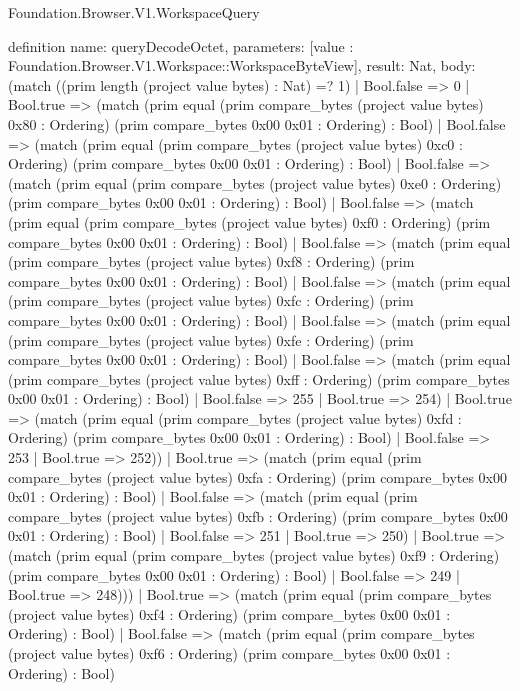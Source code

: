 \begin{lexlean}{Foundation.Browser.V1.WorkspaceQuery}
\begin{semanticmodule}
definition{
  name: queryDecodeOctet,
  parameters: [value : Foundation.Browser.V1.Workspace::WorkspaceByteView],
  result: Nat,
  body: (match ((prim length (project value bytes) : Nat) =? 1)
    | Bool.false => 0
    | Bool.true => (match (prim equal (prim compare_bytes (project value bytes) 0x80 : Ordering) (prim compare_bytes 0x00 0x01 : Ordering) : Bool)
      | Bool.false => (match (prim equal (prim compare_bytes (project value bytes) 0xc0 : Ordering) (prim compare_bytes 0x00 0x01 : Ordering) : Bool)
        | Bool.false => (match (prim equal (prim compare_bytes (project value bytes) 0xe0 : Ordering) (prim compare_bytes 0x00 0x01 : Ordering) : Bool)
          | Bool.false => (match (prim equal (prim compare_bytes (project value bytes) 0xf0 : Ordering) (prim compare_bytes 0x00 0x01 : Ordering) : Bool)
            | Bool.false => (match (prim equal (prim compare_bytes (project value bytes) 0xf8 : Ordering) (prim compare_bytes 0x00 0x01 : Ordering) : Bool)
              | Bool.false => (match (prim equal (prim compare_bytes (project value bytes) 0xfc : Ordering) (prim compare_bytes 0x00 0x01 : Ordering) : Bool)
                | Bool.false => (match (prim equal (prim compare_bytes (project value bytes) 0xfe : Ordering) (prim compare_bytes 0x00 0x01 : Ordering) : Bool)
                  | Bool.false => (match (prim equal (prim compare_bytes (project value bytes) 0xff : Ordering) (prim compare_bytes 0x00 0x01 : Ordering) : Bool)
                    | Bool.false => 255
                    | Bool.true => 254)
                  | Bool.true => (match (prim equal (prim compare_bytes (project value bytes) 0xfd : Ordering) (prim compare_bytes 0x00 0x01 : Ordering) : Bool)
                    | Bool.false => 253
                    | Bool.true => 252))
                | Bool.true => (match (prim equal (prim compare_bytes (project value bytes) 0xfa : Ordering) (prim compare_bytes 0x00 0x01 : Ordering) : Bool)
                  | Bool.false => (match (prim equal (prim compare_bytes (project value bytes) 0xfb : Ordering) (prim compare_bytes 0x00 0x01 : Ordering) : Bool)
                    | Bool.false => 251
                    | Bool.true => 250)
                  | Bool.true => (match (prim equal (prim compare_bytes (project value bytes) 0xf9 : Ordering) (prim compare_bytes 0x00 0x01 : Ordering) : Bool)
                    | Bool.false => 249
                    | Bool.true => 248)))
              | Bool.true => (match (prim equal (prim compare_bytes (project value bytes) 0xf4 : Ordering) (prim compare_bytes 0x00 0x01 : Ordering) : Bool)
                | Bool.false => (match (prim equal (prim compare_bytes (project value bytes) 0xf6 : Ordering) (prim compare_bytes 0x00 0x01 : Ordering) : Bool)
}
\end{semanticmodule}
\end{lexlean}
